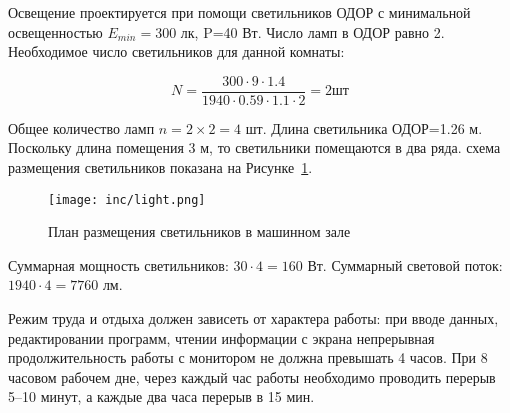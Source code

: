 Освещение проектируется при помощи светильников ОДОР с минимальной освещенностью $E_{min}=300$ лк, P=40 Вт. Число ламп в ОДОР равно 2. Необходимое число светильников для данной комнаты:

\begin{equation}
N = \frac{300 \cdot 9 \cdot 1.4}{1940 \cdot 0.59 \cdot 1.1 \cdot 2} = 2 \text{шт}
\end{equation}

Общее количество ламп $n = 2\times2=4$ шт. Длина светильника ОДОР=1.26 м. Поскольку длина помещения 3 м, то светильники помещаются в два ряда. схема размещения светильников показана на Рисунке~\ref{fig:light}.

\begin{figure}
\texttt{[image: inc/light.png]}
\caption{План размещения светильников в машинном зале}
\label{fig:light}
\end{figure}

Суммарная мощность светильников: $30\cdot4=160$ Вт. Суммарный световой поток: $1940\cdot4=7760$ лм.

Режим труда и отдыха должен зависеть от характера работы: при вводе данных, редактировании программ, чтении информации с экрана непрерывная продолжительность работы с монитором не должна превышать 4 часов. При 8 часовом рабочем дне, через каждый час работы необходимо проводить перерыв 5--10 минут, а каждые два часа перерыв в 15 мин.
